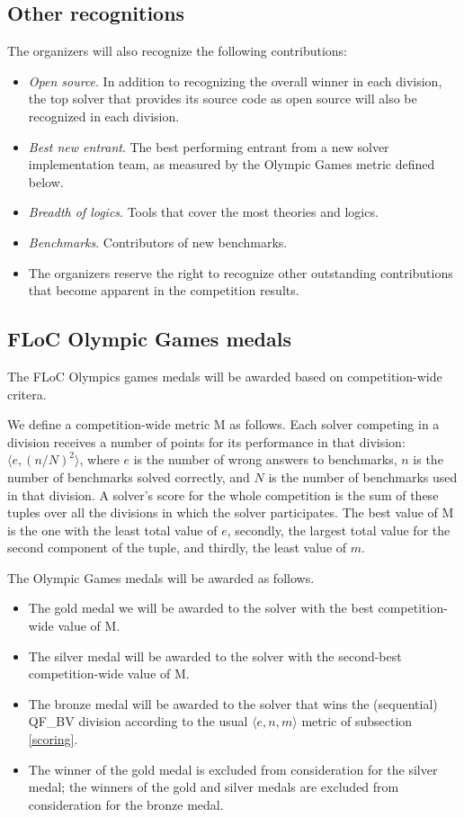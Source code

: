 \documentclass[12pt]{article}
\begin{document}
\subsection{Other recognitions}
The organizers will also recognize the following contributions:
\begin{itemize}
\item {\em Open source}. In addition to recognizing the overall
winner in each division, the top solver that provides its source code as open source will also be
recognized in each division.  
\item {\em Best new entrant}. The best performing entrant from a new solver implementation team, as measured by the Olympic Games metric defined below.
\item {\em Breadth of logics}. Tools that cover the most theories and logics.
\item {\em Benchmarks}. Contributors of new benchmarks.
\item The organizers reserve the right to recognize other outstanding contributions that become apparent in the competition results.
\end{itemize}

\subsection{FLoC Olympic Games medals}

The FLoC Olympics games medals will be awarded based on competition-wide critera.

We define a competition-wide metric M as follows. Each solver competing in a division receives a number of points for its performance in that division: $\langle e,(n/N)^2 \rangle$, where $e$ is the number of wrong answers to benchmarks, $n$ is the number of benchmarks solved correctly, and $N$ is the number of benchmarks used in that division. A solver's score for the whole competition is the sum of these tuples over all the 
divisions in which the solver participates. The best value of M is the one with the least total value of $e$, secondly, the largest total value for the second component of the tuple, and thirdly, the least value of $m$.

The Olympic Games medals will be awarded as follows.
\begin{itemize}
\item The gold medal we will be awarded to the solver with the best competition-wide value of M.
\item The silver medal will be awarded to the solver with the second-best competition-wide value of M.
\item The bronze medal will be awarded to the solver that wins the (sequential) QF\_BV division according to the usual $\langle e,n,m\rangle$ metric of subsection \ref{scoring}. 
\item The winner of the gold medal is excluded from consideration for the silver medal; the winners of the gold and silver medals are excluded from consideration for the bronze medal.
\end{itemize}
\end{document}
